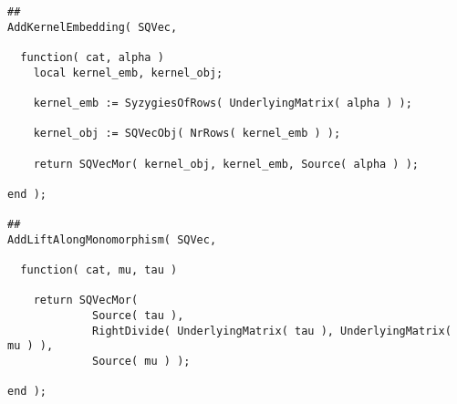 \begin{small}
\begin{Verbatim}[frame=single]
##
AddKernelEmbedding( SQVec,

  function( cat, alpha )
    local kernel_emb, kernel_obj;
    
    kernel_emb := SyzygiesOfRows( UnderlyingMatrix( alpha ) );
    
    kernel_obj := SQVecObj( NrRows( kernel_emb ) );
    
    return SQVecMor( kernel_obj, kernel_emb, Source( alpha ) );
    
end );

##
AddLiftAlongMonomorphism( SQVec,

  function( cat, mu, tau )

    return SQVecMor(
             Source( tau ),
             RightDivide( UnderlyingMatrix( tau ), UnderlyingMatrix( mu ) ),
             Source( mu ) );

end );
\end{Verbatim}
\end{small}